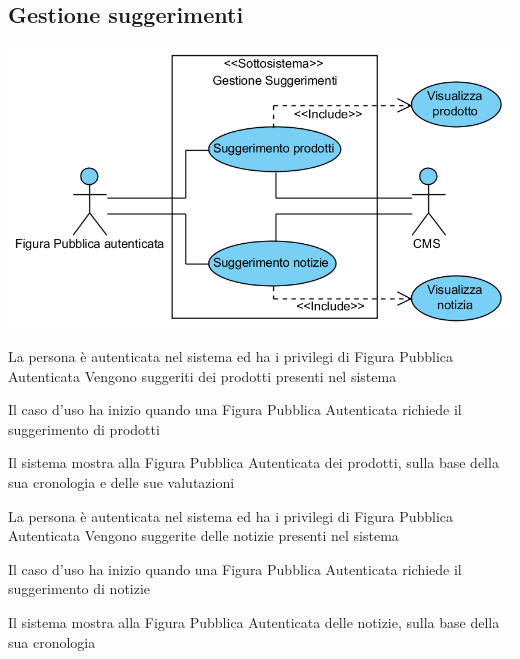 \subsection{Gestione suggerimenti}
\begin{center}
   \includegraphics[width=\textwidth]{assets/visualParadigm/GestioneSuggerimenti}
\end{center}
{}
{La persona è autenticata nel sistema ed ha i privilegi di Figura Pubblica Autenticata}
{Vengono suggeriti dei prodotti presenti nel sistema}
{\begin{enumCU}
	\item Il caso d'uso ha inizio quando una Figura Pubblica Autenticata richiede il suggerimento di prodotti
	\item Il sistema mostra alla Figura Pubblica Autenticata dei prodotti, sulla base della sua cronologia e delle sue valutazioni
\end{enumCU}}

\tabcuvspace

{}
{La persona è autenticata nel sistema ed ha i privilegi di Figura Pubblica Autenticata}
{Vengono suggerite delle notizie presenti nel sistema}
{\begin{enumCU}
	\item Il caso d'uso ha inizio quando una Figura Pubblica Autenticata richiede il suggerimento di notizie
	\item Il sistema mostra alla Figura Pubblica Autenticata delle notizie, sulla base della sua cronologia
\end{enumCU}}

